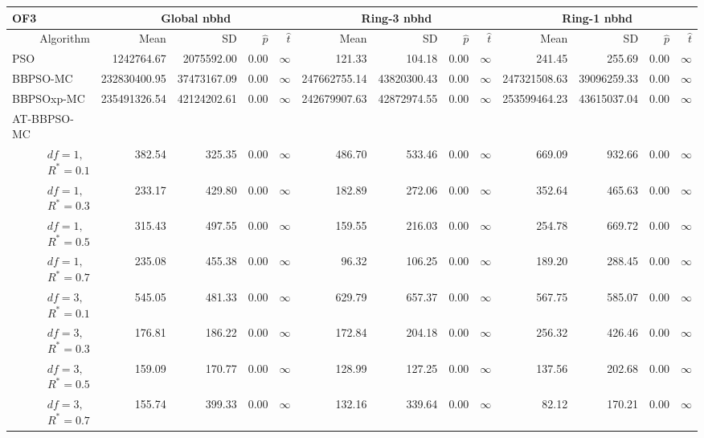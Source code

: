 \documentclass[12pt]{article}
\begin{document}
\begin{table}[ht]
\centering
\tiny{
\begin{tabular}{r|rrrr|rrrr|rrrr}
\multicolumn{1}{l}{OF3} & \multicolumn{4}{c}{Global nbhd} & \multicolumn{4}{c}{Ring-3 nbhd} & \multicolumn{4}{c}{Ring-1 nbhd}\\
  \hline
Algorithm & Mean & SD & $\widehat{p}$ & $\widehat{t}$ & Mean & SD & $\widehat{p}$ & $\widehat{t}$ & Mean & SD & $\widehat{p}$ & $\widehat{t}$ \\ 
  \hline
\multicolumn{1}{l|}{PSO} & 1242764.67 & 2075592.00 & 0.00 & $\infty$ & 121.33 & 104.18 & 0.00 & $\infty$ & 241.45 & 255.69 & 0.00 & $\infty$ \\ 
  \multicolumn{1}{l|}{BBPSO-MC} & 232830400.95 & 37473167.09 & 0.00 & $\infty$ & 247662755.14 & 43820300.43 & 0.00 & $\infty$ & 247321508.63 & 39096259.33 & 0.00 & $\infty$ \\ 
  \multicolumn{1}{l|}{BBPSOxp-MC} & 235491326.54 & 42124202.61 & 0.00 & $\infty$ & 242679907.63 & 42872974.55 & 0.00 & $\infty$ & 253599464.23 & 43615037.04 & 0.00 & $\infty$ \\ 
\hline
\multicolumn{1}{l|}{AT-BBPSO-MC} &&&&&&&&&&&&\\
  $df = 1,\enspace$ $R^* =0.1$ & 382.54 & 325.35 & 0.00 & $\infty$ & 486.70 & 533.46 & 0.00 & $\infty$ & 669.09 & 932.66 & 0.00 & $\infty$ \\ 
  $df = 1,\enspace$ $R^* =0.3$ & 233.17 & 429.80 & 0.00 & $\infty$ & 182.89 & 272.06 & 0.00 & $\infty$ & 352.64 & 465.63 & 0.00 & $\infty$ \\ 
  $df = 1,\enspace$ $R^* =0.5$ & 315.43 & 497.55 & 0.00 & $\infty$ & 159.55 & 216.03 & 0.00 & $\infty$ & 254.78 & 669.72 & 0.00 & $\infty$ \\ 
  $df = 1,\enspace$ $R^* =0.7$ & 235.08 & 455.38 & 0.00 & $\infty$ & 96.32 & 106.25 & 0.00 & $\infty$ & 189.20 & 288.45 & 0.00 & $\infty$ \\ 
  $df = 3,\enspace$ $R^* =0.1$ & 545.05 & 481.33 & 0.00 & $\infty$ & 629.79 & 657.37 & 0.00 & $\infty$ & 567.75 & 585.07 & 0.00 & $\infty$ \\ 
  $df = 3,\enspace$ $R^* =0.3$ & 176.81 & 186.22 & 0.00 & $\infty$ & 172.84 & 204.18 & 0.00 & $\infty$ & 256.32 & 426.46 & 0.00 & $\infty$ \\ 
  $df = 3,\enspace$ $R^* =0.5$ & 159.09 & 170.77 & 0.00 & $\infty$ & 128.99 & 127.25 & 0.00 & $\infty$ & 137.56 & 202.68 & 0.00 & $\infty$ \\ 
  $df = 3,\enspace$ $R^* =0.7$ & 155.74 & 399.33 & 0.00 & $\infty$ & 132.16 & 339.64 & 0.00 & $\infty$ & 82.12 & 170.21 & 0.00 & $\infty$ \\ 

\end{tabular}}
\end{table}
\end{document}

